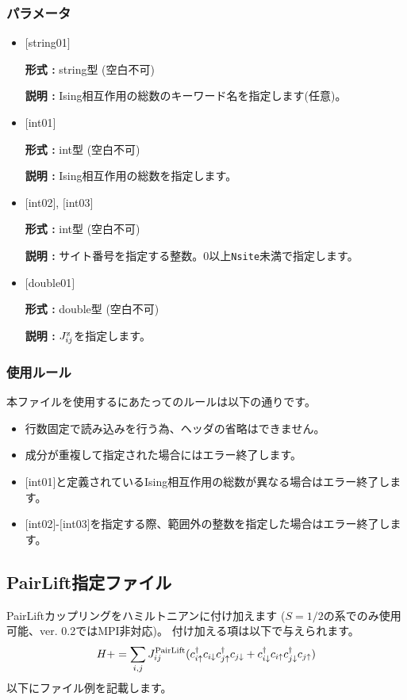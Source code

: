 \subsubsection{パラメータ}
 \begin{itemize}

   \item  $[$string01$]$
   
    {\bf 形式 :} string型 (空白不可)

   {\bf 説明 :} Ising相互作用の総数のキーワード名を指定します(任意)。

   \item  $[$int01$]$
   
    {\bf 形式 :} int型 (空白不可)

   {\bf 説明 :} Ising相互作用の総数を指定します。

  \item  $[$int02$]$, $[$int03$]$
  
 {\bf 形式 :} int型 (空白不可)

{\bf 説明 :} サイト番号を指定する整数。0以上\verb|Nsite|{未満}で指定します。
 
 \item  $[$double01$]$
   
   {\bf 形式 :} double型 (空白不可)

  {\bf 説明 :}  $J_{ij}^{\rm z}$を指定します。
  
\end{itemize}

\subsubsection{使用ルール}
本ファイルを使用するにあたってのルールは以下の通りです。
\begin{itemize}
\item 行数固定で読み込みを行う為、ヘッダの省略はできません。
\item 成分が重複して指定された場合にはエラー終了します。
\item $[$int01$]$と定義されているIsing相互作用の総数が異なる場合はエラー終了します。
\item $[$int02$]$-$[$int03$]$を指定する際、範囲外の整数を指定した場合はエラー終了します。
\end{itemize}

\newpage
\subsection{PairLift指定ファイル}
\label{Subsec:pairlift}
PairLiftカップリングをハミルトニアンに付け加えます{ ($S=1/2$の系でのみ使用可能、ver. 0.2ではMPI非対応)}。
付け加える項は以下で与えられます。
\begin{equation}
H+=\sum_{i,j}J_{ij}^{\rm PairLift} (c_ {i \uparrow}^{\dag}c_{i\downarrow}c_{j \uparrow}^{\dag}c_{j \downarrow}+c_ {i \downarrow}^{\dag}c_{i\uparrow}c_{j \downarrow}^{\dag}c_{j \uparrow})
\end{equation}
以下にファイル例を記載します。

